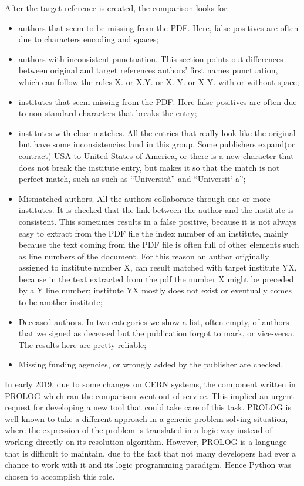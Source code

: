 After the target reference is created, the comparison looks for:
\begin{itemize}
\item authors that seem to be missing from the PDF. Here, false positives are often due to characters encoding and spaces;
\item authors with inconsistent punctuation. This section points out differences between original and target references authors' first names punctuation,
which can follow the rules X. or X.Y. or X.-Y. or X-Y. with or without space;
\item institutes that seem missing from the PDF. Here false positives are often due to non-standard characters that breaks the entry;
\item institutes with close matches. All the entries that really look like the original but have some inconsistencies land in this group.
  Some publishers expand(or contract) USA to United States of America,
  or there is a new character that does not break the institute entry,
  but makes it so that the match is not perfect match, such as such as \enquote{Università} and \enquote{Universit` a};
\item Mismatched authors. All the authors collaborate through one or more institutes.
  It is checked that the link between the author and the institute is consistent.
  This sometimes results in a false positive,
  because it is not always easy to extract from the PDF file the index number of an institute,
  mainly because the text coming from the PDF file is often full of other elements such as line numbers of the document.
  For this reason an author originally assigned to institute number X, can result matched with target institute YX,
  because in the text extracted from the pdf the number X might be preceded by a Y line number;
  institute YX mostly does not exist or eventually comes to be another institute;
\item Deceased authors. In two categories we show a list, often empty, of authors that we signed as deceased but the publication forgot to mark, or vice-versa.
  The results here are pretty reliable;
\item Missing funding agencies, or wrongly added by the publisher are checked.
\end{itemize}

In early 2019, due to some changes on CERN systems, the component written in PROLOG which ran the comparison went out of service.
This implied an urgent request for developing a new tool that could take care of this task.
PROLOG is well known to take a different approach in a generic problem solving situation,
where the expression of the problem is translated in a logic way instead of working directly on its resolution algorithm.
However, PROLOG is a language that is difficult to maintain,
due to the fact that not many developers had ever a chance to work with it and its logic programming paradigm.
Hence Python was chosen to accomplish this role.

